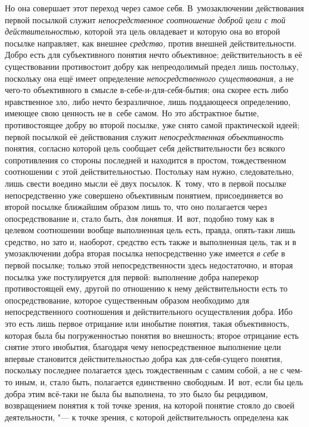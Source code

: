 Но она совершает этот переход через самое себя.
В~умозаключении действования первой посылкой служит
{\em непосредственное соотношение доброй
цели с той действительностью,} которой эта цель овладевает и
которую она во второй посылке направляет, как внешнее {\em средство,} против
внешней действительности. Добро есть для субъективного понятия нечто
объективное; действительность в её существовании противостоит добру как
непреодолимый предел лишь постольку, поскольку она ещё имеет определение
{\em непосредственного существования,}
а не чего-то объективного в смысле в-себе-и-для-себя-бытия;
она скорее есть либо нравственное зло, либо нечто безразличное, лишь
поддающееся определению, имеющее свою ценность не в~себе самом. Но это
абстрактное бытие, противостоящее добру во второй посылке,
уже снято самой практической идеей; первой посылкой её действования служит
{\em непосредственная объективность}
понятия, согласно которой цель сообщает себя действительности
без всякого сопротивления со стороны последней и находится в простом,
тождественном соотношении с этой действительностью. Постольку нам нужно,
следовательно, лишь свести воедино мысли её двух посылок. К~тому, что в
первой посылке непосредственно уже совершено объективным понятием,
присоединяется во второй посылке ближайшим образом лишь то, что оно
полагается через опосредствование и, стало быть,
{\em для понятия}. И~вот,
подобно тому как в целевом соотношении вообще выполненная цель есть,
правда, опять-таки лишь средство, но зато и, наоборот, средство есть также
и выполненная цель, так и в умозаключении добра вторая посылка
непосредственно уже имеется {\em в
себе} в первой посылке; только этой непосредственности здесь
недостаточно, и вторая посылка уже постулируется для первой: выполнение
добра наперекор противостоящей ему, другой по отношению к нему
действительности есть то опосредствование, которое существенным образом
необходимо для непосредственного соотношения и действительного
осуществления добра. Ибо это есть лишь первое отрицание или инобытие
понятия, такая объективность, которая была бы погруженностью понятия во
внешность; второе отрицание есть снятие этого инобытия, благодаря чему
непосредственное выполнение цели впервые становится действительностью добра
как для-себя-сущего понятия, поскольку последнее полагается здесь
тождественным с самим собой, а не с чем-то иным, и, стало быть,
полагается единственно свободным. И~вот, если бы цель добра этим всё-таки
не была бы выполнена, то это было бы рецидивом, возвращением понятия к той
точке зрения, на которой понятие стояло до своей деятельности, "---
к точке зрения, с которой действительность определена как
